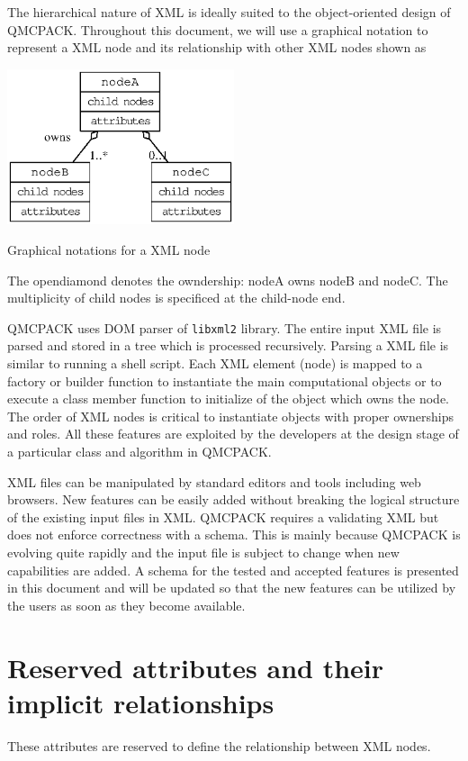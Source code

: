 The hierarchical nature of X\-M\-L is ideally suited to the object-\/oriented design of Q\-M\-C\-P\-A\-C\-K. Throughout this document, we will use a graphical notation to represent a X\-M\-L node and its relationship with other X\-M\-L nodes shown as 
\begin{DoxyImage}
\includegraphics[width=0.5\textwidth,height=\textheight/2,keepaspectratio=true]{dot_xmlsymbols}
\caption{Graphical notations for a X\-M\-L node}
\end{DoxyImage}
 The opendiamond denotes the owndership\-: node\-A owns node\-B and node\-C. The multiplicity of child nodes is specificed at the child-\/node end.

Q\-M\-C\-P\-A\-C\-K uses D\-O\-M parser of {\tt libxml2} library. The entire input X\-M\-L file is parsed and stored in a tree which is processed recursively. Parsing a X\-M\-L file is similar to running a shell script. Each X\-M\-L element (node) is mapped to a factory or builder function to instantiate the main computational objects or to execute a class member function to initialize of the object which owns the node. The order of X\-M\-L nodes is critical to instantiate objects with proper ownerships and roles. All these features are exploited by the developers at the design stage of a particular class and algorithm in Q\-M\-C\-P\-A\-C\-K.

X\-M\-L files can be manipulated by standard editors and tools including web browsers. New features can be easily added without breaking the logical structure of the existing input files in X\-M\-L. Q\-M\-C\-P\-A\-C\-K requires a validating X\-M\-L but does not enforce correctness with a schema. This is mainly because Q\-M\-C\-P\-A\-C\-K is evolving quite rapidly and the input file is subject to change when new capabilities are added. A schema for the tested and accepted features is presented in this document and will be updated so that the new features can be utilized by the users as soon as they become available.\section{Reserved attributes and their implicit relationships}\label{a00004_attributeX}
These attributes are reserved to define the relationship between X\-M\-L nodes.


